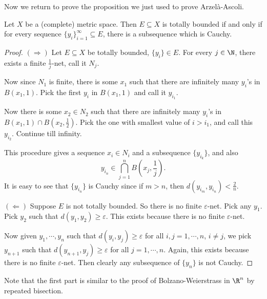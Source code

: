 \documentclass[a4paper]{article}
\begin{document}
Now we return to prove the proposition we just used to prove Arzel\`a-Ascoli.
\begin{prop}
  Let $X$ be a (complete) metric space. Then $E\subseteq X$ is totally bounded if and only if for every sequence $\{y_i\}_{i = 1}^\infty \subseteq E$, there is a subsequence which is Cauchy.
\end{prop}

\begin{proof}
  $(\Rightarrow)$ Let $E \subseteq X$ be totally bounded, $\{y_i\} \in E$. For every $j \in \N$, there exists a finite $\frac{1}{j}$-net, call it $N_j$.

  Now since $N_1$ is finite, there is some $x_1$ such that there are infinitely many $y_i$'s in $B(x_1, 1)$. Pick the first $y_i$ in $B(x_1, 1)$ and call it $y_{i_1}$.

  Now there is some $x_2 \in N_2$ such that there are infinitely many $y_i$'s in $B(x_1, 1) \cap B(x_2, \frac{1}{2})$. Pick the one with smallest value of $i > i_1$, and call this $y_{i_2}$. Continue till infinity.

  This procedure gives a sequence $x_i \in N_i$ and a subsequence $\{y_{i_k}\}$, and also
  \[
    y_{i_n} \in \bigcap_{j = 1}^n B\left(x_j, \frac{1}{j}\right).
  \]
  It is easy to see that $\{y_{i_n}\}$ is Cauchy since if $m > n$, then $d(y_{i_m}, y_{i_n}) < \frac{2}{n}$.

  $(\Leftarrow)$ Suppose $E$ is not totally bounded. So there is no finite $\varepsilon$-net. Pick any $y_1$. Pick $y_2$ such that $d(y_1, y_2) \geq \varepsilon$. This exists because there is no finite $\varepsilon$-net.

  Now given $y_1, \cdots, y_n$ such that $d(y_i, y_j) \geq \varepsilon$ for all $i, j = 1, \cdots, n$, $i \not= j$, we pick $y_{n + 1}$ such that $d(y_{n + 1}, y_j) \geq \varepsilon$ for all $j = 1, \cdots, n$. Again, this exists because there is no finite $\varepsilon$-net. Then clearly any subsequence of $\{y_n\}$ is not Cauchy.
\end{proof}
Note that the first part is similar to the proof of Bolzano-Weierstrass in $\R^n$ by repeated bisection.
\end{document}
